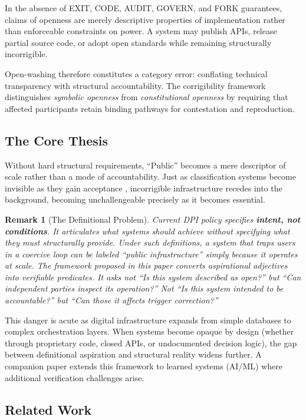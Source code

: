 \documentclass{article}
\newtheorem{remark}{Remark}
\begin{document}
In the absence of EXIT, CODE, AUDIT, GOVERN, and FORK guarantees, claims of openness are merely descriptive properties of implementation rather than enforceable constraints on power. A system may publish APIs, release partial source code, or adopt open standards while remaining structurally incorrigible.

Open-washing therefore constitutes a category error: conflating technical transparency with structural accountability. The corrigibility framework distinguishes \textit{symbolic openness} from \textit{constitutional openness} by requiring that affected participants retain binding pathways for contestation and reproduction.

\subsection{The Core Thesis}

Without hard structural requirements, ``Public'' becomes a mere descriptor of scale rather than a mode of accountability. Just as classification systems become invisible as they gain acceptance \citep{bowker1999}, incorrigible infrastructure recedes into the background, becoming unchallengeable precisely as it becomes essential.

\begin{remark}[The Definitional Problem]
Current DPI policy specifies \textbf{intent, not conditions}. It articulates what systems \textit{should} achieve without specifying what they \textit{must} structurally provide. Under such definitions, a system that traps users in a coercive loop can be labeled ``public infrastructure'' simply because it operates at scale. The framework proposed in this paper converts aspirational adjectives into verifiable predicates. It asks not ``Is this system described as open?'' but ``Can independent parties inspect its operation?'' Not ``Is this system intended to be accountable?'' but ``Can those it affects trigger correction?''
\end{remark}

This danger is acute as digital infrastructure expands from simple databases to complex orchestration layers. When systems become opaque by design (whether through proprietary code, closed APIs, or undocumented decision logic), the gap between definitional aspiration and structural reality widens further. A companion paper extends this framework to learned systems (AI/ML) where additional verification challenges arise.

\subsection{Related Work}
\end{document}
